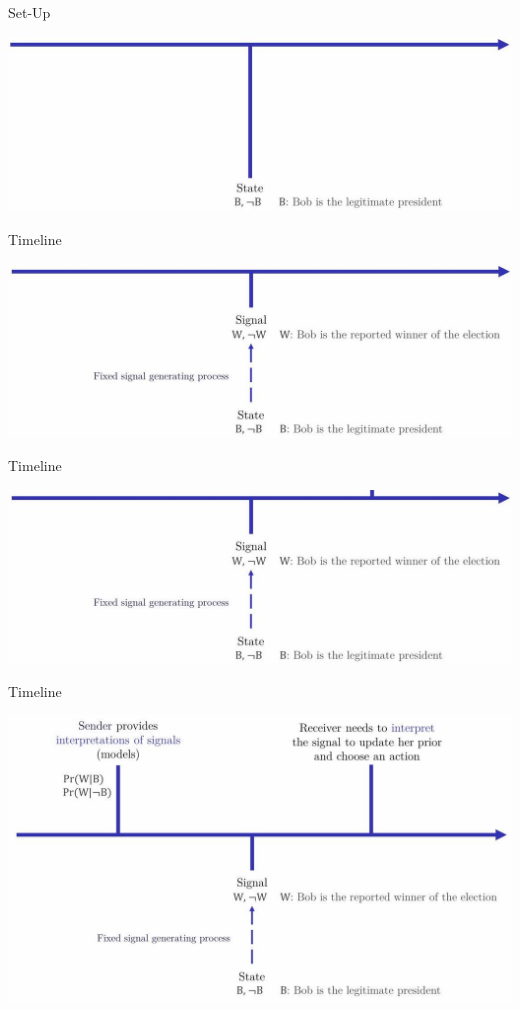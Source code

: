 \documentclass[aspectratio=169]{beamer}
\theoremstyle{definition}
\theoremstyle{plain}
\theoremstyle{plain}
\theoremstyle{definition}
\theoremstyle{plain}
\theoremstyle{plain}
\theoremstyle{plain}
\theoremstyle{plain}
\theoremstyle{remark}
\theoremstyle{definition}
\begin{document}
\begin{frame}{Set-Up}
  \begin{center}
    \includegraphics[width=.8\textwidth]{fig_intro/fig1.jpg}
  \end{center}
\end{frame}

\begin{frame}{Timeline}
  \begin{center}
    \includegraphics[width=.8\textwidth]{fig_intro/fig2.jpg}
  \end{center}
\end{frame}

\begin{frame}{Timeline}
  \begin{center}
    \includegraphics[width=.8\textwidth]{fig_intro/fig3.jpg}
  \end{center}

\end{frame}
\begin{frame}{Timeline}

  \begin{center}
    \includegraphics[width=.8\textwidth]{fig_intro/fig4.jpg}
  \end{center}
 \end{frame}
\end{document}
